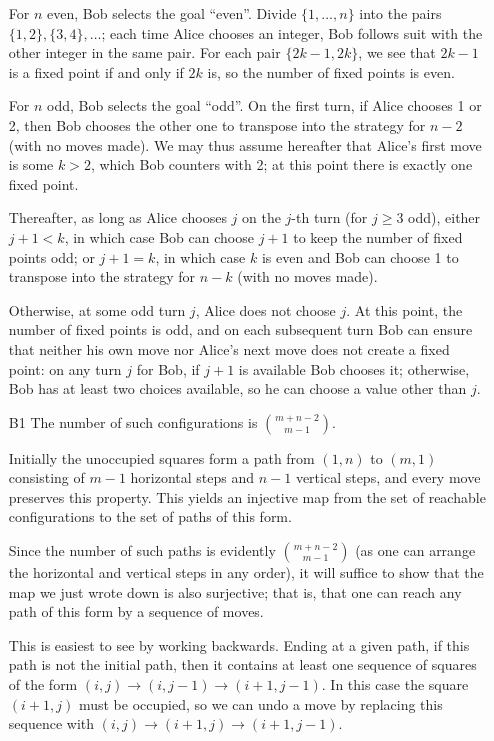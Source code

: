 \documentclass[amssymb,twocolumn,pra,10pt,aps]{revtex4-1}
\begin{document}
\begin{itemize}
For $n$ even, Bob selects the goal ``even''. Divide $\{1,\dots,n\}$ into the pairs $\{1,2\},\{3,4\},\dots$; each time Alice chooses an integer, Bob follows suit with the other integer in the same pair. For each pair $\{2k-1,2k\}$, we see that $2k-1$ is a fixed point if and only if $2k$ is, so the number of fixed points is even.

For $n$ odd, Bob selects the goal ``odd''. On the first turn, if Alice chooses 1 or 2, then Bob chooses the other one to transpose into the strategy for $n-2$ (with no moves made). We may thus assume hereafter that Alice's first move is some $k > 2$, which Bob counters with 2; at this point there is exactly one fixed point. 

Thereafter, as long as Alice chooses $j$ on the $j$-th turn (for $j \geq 3$ odd), either $j+1 < k$, in which case Bob can choose $j+1$
to keep the number of fixed points odd; or $j+1=k$, in which case $k$ is even and Bob can choose 1 to transpose into the strategy for  $n-k$ (with no moves made).

Otherwise, at some odd turn $j$, Alice does not choose $j$. At this point, the number of fixed points is odd, and on each subsequent turn Bob can ensure that neither his own move nor Alice's next move does not create a fixed point: on any turn $j$ for Bob, if $j+1$ is available Bob chooses it; otherwise, Bob has at least two choices available, so he can choose a value other than $j$.


\item[B1]
The number of such configurations is $\binom{m+n-2}{m-1}$.

Initially the unoccupied squares form a path from $(1,n)$ to $(m,1)$ consisting of $m-1$ horizontal steps and $n-1$ vertical steps,
and every move preserves this property. This yields an injective map from the set of reachable configurations to the set of paths of this form.

Since the number of such paths is evidently $\binom{m+n-2}{m-1}$ (as one can arrange the horizontal and vertical steps in any order),
it will suffice to show that the map we just wrote down is also surjective; that is, that one can reach any path of this form by a sequence of moves. 

This is easiest to see by working backwards. Ending at a given path, if this path is not the initial path, then it contains at least one sequence of squares of the form $(i,j) \to (i,j-1) \to (i+1,j-1)$.
In this case the square $(i+1,j)$ must be occupied, so we can undo a move by replacing this sequence with 
$(i,j) \to (i+1,j) \to (i+1,j-1)$.


\end{itemize}
\end{document}
